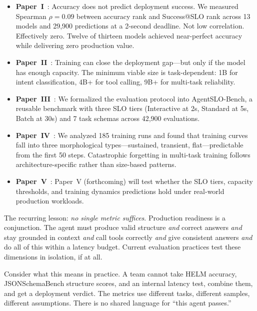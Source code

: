 \documentclass[11pt]{article}
\begin{document}
\begin{itemize}[leftmargin=12pt]
  \item \textbf{Paper~I}~\citep{maloney2025deploymentgap}: Accuracy does not predict deployment success. We measured Spearman $\rho = 0.09$ between accuracy rank and Success@SLO rank across 13 models and 29{,}900 predictions at a 2-second deadline. Not low correlation. Effectively zero. Twelve of thirteen models achieved near-perfect accuracy while delivering zero production value.

  \item \textbf{Paper~II}~\citep{maloney2025capacity}: Training can close the deployment gap---but only if the model has enough capacity. The minimum viable size is task-dependent: 1B for intent classification, 4B+ for tool calling, 9B+ for multi-task reliability.

  \item \textbf{Paper~III}~\citep{maloney2025agentslobench}: We formalized the evaluation protocol into AgentSLO-Bench, a reusable benchmark with three SLO tiers (Interactive at 2s, Standard at 5s, Batch at 30s) and 7 task schemas across 42{,}900 evaluations.

  \item \textbf{Paper~IV}~\citep{maloney2025dynamics}: We analyzed 185 training runs and found that training curves fall into three morphological types---sustained, transient, flat---predictable from the first 50 steps. Catastrophic forgetting in multi-task training follows architecture-specific rather than size-based patterns.

  \item \textbf{Paper~V}~\citep{maloney2025fieldreport}: Paper~V (forthcoming) will test whether the SLO tiers, capacity thresholds, and training dynamics predictions hold under real-world production workloads.
\end{itemize}

The recurring lesson: \emph{no single metric suffices}. Production readiness is a conjunction. The agent must produce valid structure \emph{and} correct answers \emph{and} stay grounded in context \emph{and} call tools correctly \emph{and} give consistent answers \emph{and} do all of this within a latency budget. Current evaluation practices test these dimensions in isolation, if at all.

Consider what this means in practice. A team cannot take HELM accuracy, JSONSchemaBench structure scores, and an internal latency test, combine them, and get a deployment verdict. The metrics use different tasks, different samples, different assumptions. There is no shared language for ``this agent passes.''
\end{document}
